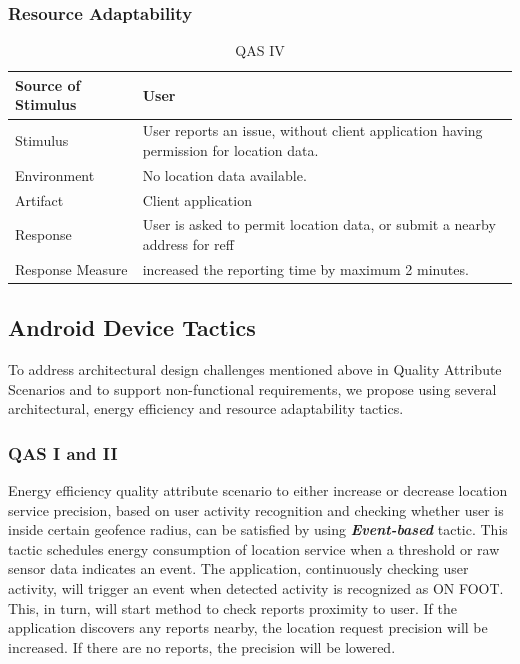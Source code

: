 \subsubsection{Resource Adaptability}

\begin{table}[H]
\centering
\caption{QAS IV}
\label{tab:qasIV}
\begin{tabularx}{\textwidth}{|l|X|}
\hline
Source of Stimulus & User \\ \hline
Stimulus & User reports an issue, without client application having permission for location data. \\ \hline
Environment & No location data available. \\ \hline
Artifact & Client application \\ \hline
Response & User is asked to permit location data, or submit a nearby address for reff \\ \hline
Response Measure & increased the reporting time by maximum 2 minutes. \\ \hline
\end{tabularx}
\end{table}

\subsection{Android Device Tactics} \label{sec:tactics}
To address architectural design challenges mentioned above in Quality Attribute Scenarios and to support non-functional requirements, we propose using several architectural, energy efficiency and resource adaptability tactics.

\subsubsection{QAS I and II}
Energy efficiency quality attribute scenario to either increase or decrease location service precision, based on user activity recognition and checking whether user is inside certain geofence radius, can be satisfied by using \textbf{\textit{Event-based}} tactic. This tactic schedules energy consumption of location service when a threshold or raw sensor data indicates an event. The application, continuously checking user activity, will trigger an event when detected activity is recognized as ON FOOT. This, in turn, will start method to check reports proximity to user.  If the application discovers any reports nearby, the location request precision will be increased. If there are no reports, the precision will be lowered.

